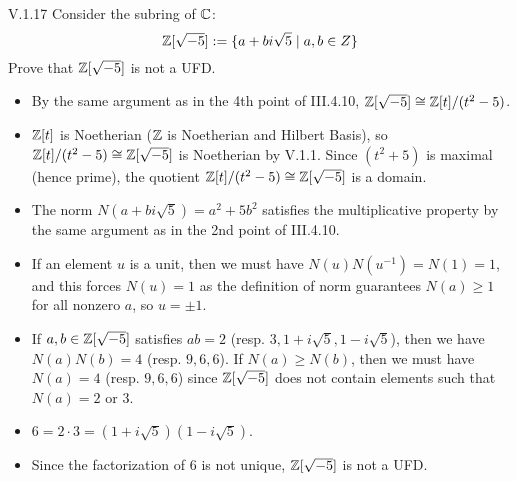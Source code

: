 \begin{problem}{V.1.17}
    Consider the subring of $\mathbb{C}$:
    \[
    \mathbb{Z}[\sqrt{-5}] := \{a+bi\sqrt{5} \; | \; a,b\in Z\}	
    \]
    Prove that $\mathbb{Z}[\sqrt{-5}]$ is not a UFD.
    \end{problem}
    \begin{pf}
\begin{itemize}
    \setlength\itemsep{0pt}
    \item By the same argument as in the 4th point of III.4.10, $\mathbb{Z}[\sqrt{-5}] \cong \mathbb{Z}[t]/(t^2-5)$.
    \item $\mathbb{Z}[t]$ is Noetherian ($\mathbb{Z}$ is Noetherian and Hilbert Basis), so $\mathbb{Z}[t]/(t^2-5) \cong \mathbb{Z}[\sqrt{-5}]$ is Noetherian by V.1.1. Since $(t^2 + 5)$ is maximal (hence prime), the quotient $\mathbb{Z}[t]/(t^2-5) \cong \mathbb{Z}[\sqrt{-5}]$ is a domain.
    \item The norm $N(a+bi\sqrt{5}) = a^2 + 5b^2$ satisfies the multiplicative property by the same argument as in the 2nd point of III.4.10.
    \item If an element $u$ is a unit, then we must have $N(u)N(u^{-1}) = N(1) = 1$, and this forces $N(u) = 1$ as the definition of norm guarantees $N(a) \geq 1$ for all nonzero $a$, so $u = \pm 1 $.
    \item If $a, b \in \mathbb{Z}[\sqrt{-5}]$ satisfies $ab = 2$ (resp. $3, 1+i\sqrt{5}, 1-i\sqrt{5}$), then we have $N(a)N(b) = 4$ (resp. $9,6,6$). If $N(a) \geq N(b)$, then we must have $N(a) = 4$ (resp. $9,6,6$) since $\mathbb{Z}[\sqrt{-5}]$ does not contain elements such that $N(a) = 2 \text{ or } 3$.
    \item $6 = 2 \cdot 3 = (1 + i \sqrt{5}) (1 - i \sqrt{5})$.
    \item Since the factorization of $6$ is not unique, $\mathbb{Z}[\sqrt{-5}]$ is not a UFD.
\end{itemize}
\end{pf}